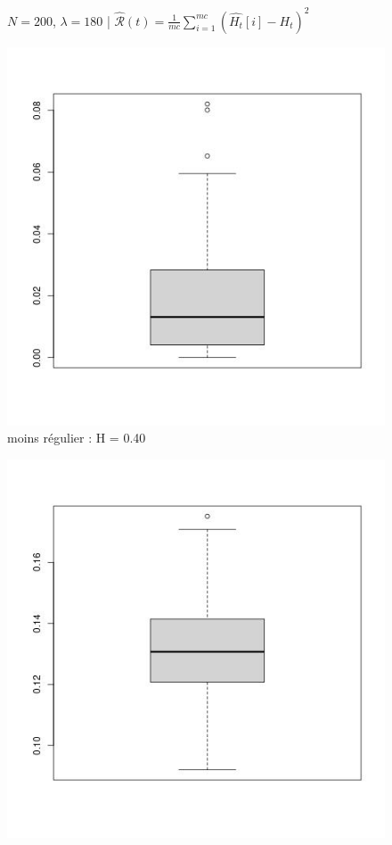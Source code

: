 \begin{figure}[H]
	\centering
	$N = 200$, $\lambda = 180$ | $\widehat{\mathcal R}(t) = \frac 1 {mc} \sum\limits_{i=1}^{mc} (\widehat{H_t}[i] - H_t)^2$

	\centering
	\noindent\begin{minipage}{0.32\linewidth}
		\centering
		\includegraphics[width=\textwidth]{Images/N200_lbd180_box3_2.jpg}
		moins régulier : H = 0.40
	\end{minipage}
	\begin{minipage}{0.32\linewidth}
		\centering
		\includegraphics[width=\textwidth]{Images/N200_lbd180_box6_2.jpg}

\end{minipage}
\end{figure}

